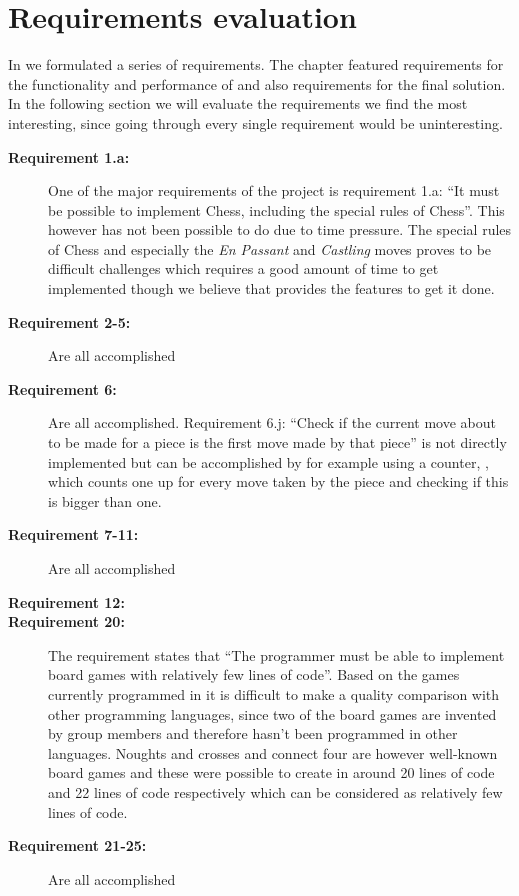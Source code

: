 \section{Requirements evaluation}
\label{sec:requirementsevaluation}

In  we formulated a series of requirements. The chapter featured requirements for the functionality and performance of \productname{} and also requirements for the final solution. In the following section we will evaluate the requirements we find the most interesting, since going through every single requirement would be uninteresting. 

\begin{description}
\item[\textbf{Requirement 1.a:}]
One of the major requirements of the project is requirement 1.a: ``It must be possible to implement Chess, including the special rules of Chess''. This however has not been possible to do due to time pressure. The special rules of Chess and especially the \emph{En Passant} and \emph{Castling} moves proves to be difficult challenges which requires a good amount of time to get implemented though we believe that \productname{} provides the features to get it done.

\item[\textbf{Requirement 2-5:}]
Are all accomplished

\item[\textbf{Requirement 6:}]
Are all accomplished. Requirement 6.j: ``Check if the current move about to be made for a piece is the first move made by that piece'' is not directly implemented but can be accomplished by for example using a counter, , which counts one up for every move taken by the piece and checking if this is bigger than one.

\item[\textbf{Requirement 7-11:}]
Are all accomplished

\item[\textbf{Requirement 12:}]


\item[\textbf{Requirement 20:}]
The requirement states that ``The programmer must be able to implement board games with relatively few lines of code''. Based on the games currently programmed in \productname{} it is difficult to make a quality comparison with other programming languages, since two of the board games are invented by group members and therefore hasn't been programmed in other languages. Noughts and crosses and connect four are however well-known board games and these were possible to create in around 20 lines of code and 22 lines of code respectively which can be considered as relatively few lines of code.

\item[\textbf{Requirement 21-25:}]
Are all accomplished




\end{description} 